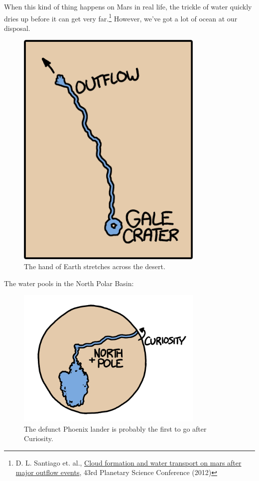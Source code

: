 {{When this kind of thing happens on Mars in real life, the trickle of water quickly dries up before it can get very far.{\footnote{D. L. Santiago et. al., \href{http://www.lpi.usra.edu/meetings/lpsc2012/pdf/2438.pdf}{Cloud formation and water transport on mars after major outflow events}, 43rd Planetary Science Conference (2012)} } However, we've got a lot of ocean at our disposal.}

\begin{figure}[!htbp]
\centering
\includegraphics[scale=0.5, max width=0.8\textwidth]{imgs/a/54/mars_4.png}
\caption{The hand of Earth stretches across the desert.}
\end{figure}

{The water pools in the North Polar Basin:}

\begin{figure}[!htbp]
\centering
\includegraphics[scale=0.5, max width=0.8\textwidth]{imgs/a/54/mars_5.png}
\caption{The defunct Phoenix lander is probably the first to go after Curiosity.}
\end{figure}

}
